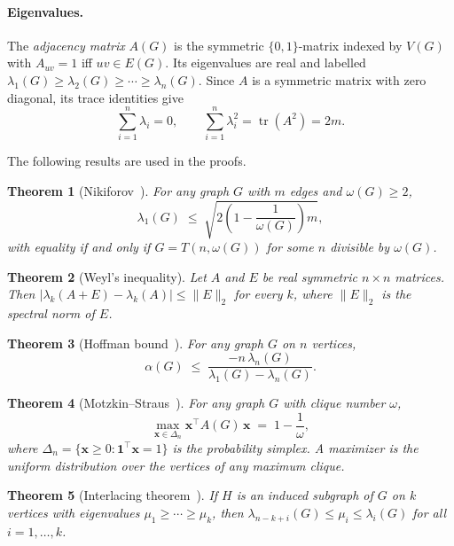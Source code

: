 \documentclass[preprint,12pt]{elsarticle}
\theoremstyle{plain}
\newtheorem{theorem}{Theorem}[section]
\theoremstyle{definition}
\newcommand{\tr}{\operatorname{tr}}
\begin{document}
\paragraph{Eigenvalues.}
The \emph{adjacency matrix} $A(G)$ is the symmetric $\{0,1\}$-matrix
indexed by $V(G)$ with $A_{uv} = 1$ iff $uv \in E(G)$.
Its eigenvalues are real and labelled
$\lambda_1(G) \geq \lambda_2(G) \geq \cdots \geq \lambda_n(G)$.
Since $A$ is a symmetric matrix with zero diagonal, its trace identities give
\begin{equation}
  \label{eq:trace}
  \sum_{i=1}^n \lambda_i = 0,
  \qquad
  \sum_{i=1}^n \lambda_i^2 = \tr(A^2) = 2m.
\end{equation}

The following results are used in the proofs.

\begin{theorem}[Nikiforov~\cite{Nikiforov2002}]
  \label{thm:nikiforov}
  For any graph $G$ with $m$ edges and $\omega(G) \geq 2$,
  \[
    \lambda_1(G)
    \;\leq\;
    \sqrt{2\!\left(1 - \frac{1}{\omega(G)}\right) m},
  \]
  with equality if and only if $G = T(n,\omega(G))$ for some $n$
  divisible by $\omega(G)$.
\end{theorem}

\begin{theorem}[Weyl's inequality]
  \label{thm:weyl}
  Let $A$ and $E$ be real symmetric $n \times n$ matrices.  Then
  $|\lambda_k(A + E) - \lambda_k(A)| \leq \|E\|_2$ for every $k$,
  where $\|E\|_2$ is the spectral norm of $E$.
\end{theorem}

\begin{theorem}[Hoffman bound~\cite{Hoffman1970}]
  \label{thm:hoffman}
  For any graph $G$ on $n$ vertices,
  \[
    \alpha(G)
    \;\leq\;
    \frac{-n\,\lambda_n(G)}{\lambda_1(G) - \lambda_n(G)}.
  \]
\end{theorem}

\begin{theorem}[Motzkin--Straus~\cite{MotzkinStraus1965}]
  \label{thm:MS}
  For any graph $G$ with clique number $\omega$,
  \[
    \max_{\mathbf{x} \in \Delta_n}
    \mathbf{x}^\top A(G)\, \mathbf{x}
    \;=\;
    1 - \frac{1}{\omega},
  \]
  where $\Delta_n = \{\mathbf{x} \geq 0 : \mathbf{1}^\top \mathbf{x} = 1\}$
  is the probability simplex.
  A maximizer is the uniform distribution over the vertices of any maximum
  clique.
\end{theorem}

\begin{theorem}[Interlacing theorem~\cite{HaemersInterlacing}]
  \label{thm:interlace}
  If $H$ is an induced subgraph of $G$ on $k$ vertices with eigenvalues
  $\mu_1 \geq \cdots \geq \mu_k$, then
  $\lambda_{n-k+i}(G) \leq \mu_i \leq \lambda_i(G)$ for all $i = 1, \ldots, k$.
\end{theorem}
\end{document}
